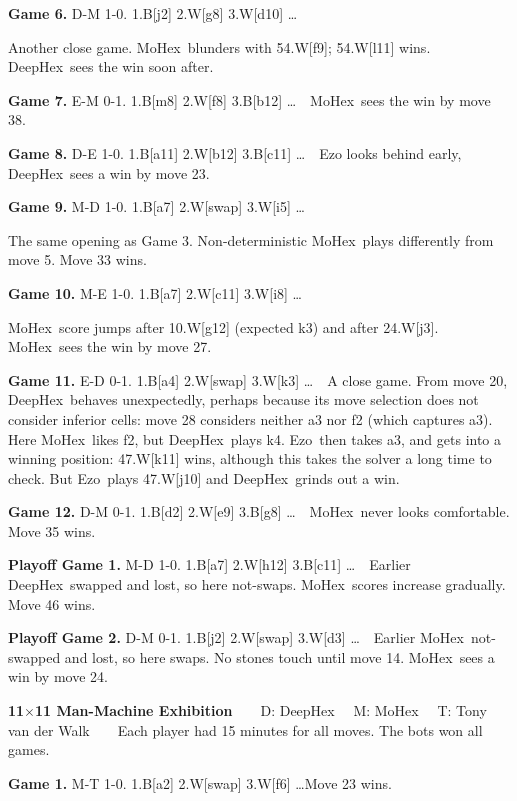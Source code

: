 \documentclass{icga}
\def\Dx{\mbox{\sc DeepHex}}
\def\Eo{\mbox{\sc Ezo}}
\def\Mx{\mbox{\sc MoHex}}
\def\TV{\mbox{\sc TV}} %
\begin{document}
{\bf Game 6.}
{\sc D-M 1-0.}
1.B[j2] 2.W[g8] 3.W[d10] \ldots \ \ 

\hfill Another close game.
\Mx\ blunders with 54.W[f9]; 54.W[l11] wins.
\Dx\ sees the win soon after.

{\bf Game 7.}
{\sc E-M 0-1.}
1.B[m8] 2.W[f8] 3.B[b12] \ldots \ \ 
\hfill\Mx\ sees the win by move 38.

{\bf Game 8.}
{\sc D-E 1-0.}
1.B[a11] 2.W[b12] 3.B[c11] \ldots \ \ 
\Eo{} looks behind early, \Dx\ sees a win by move 23.

{\bf Game 9.}
{\sc M-D 1-0.}
1.B[a7] 2.W[swap] 3.W[i5] \ldots \ \ 

\hfill The same opening as Game 3.
Non-deterministic \Mx\ plays differently from move 5.
Move 33 wins.

{\bf Game 10.}
{\sc M-E 1-0.}
1.B[a7] 2.W[c11] 3.W[i8] \ldots \ \ 

\hfill\Mx{}ore jumps after 10.W[g12] (expected k3)
and after 24.W[j3]. \Mx\ sees the win by move 27.

{\bf Game 11.}
{\sc E-D 0-1.}
1.B[a4] 2.W[swap] 3.W[k3] \ldots \ \ 
A close game. From move 20, \Dx\ behaves unexpectedly,
perhaps because its move selection does not consider inferior cells:
move 28 considers neither a3 nor f2 (which captures a3).
Here \Mx\ likes f2, but \Dx\ plays k4.
\Eo\ then takes a3, and gets into a winning position:
47.W[k11] wins, although this takes the solver a long time to check.
But \Eo\ plays 47.W[j10] and \Dx\ grinds out a win.

{\bf Game 12.}
{\sc D-M 0-1.}
1.B[d2] 2.W[e9] 3.B[g8] \ldots \ \ 
\hfill\Mx\ never looks comfortable. Move 35 wins.

{\bf Playoff Game 1.}
{\sc M-D 1-0.}
1.B[a7] 2.W[h12] 3.B[c11] \ldots \ \ 
Earlier \Dx\ swapped and lost, so here not-swaps.
\Mx{}ores increase gradually. Move 46 wins.

{\bf Playoff Game 2.}
{\sc D-M 0-1.}
1.B[j2] 2.W[swap] 3.W[d3] \ldots \ \ 
Earlier \Mx\ not-swapped and lost, so here swaps. 
No stones touch until move 14. \Mx\ sees a win by move 24.

{\large\bf 11$\times$11 Man-Machine Exhibition} 
~ ~ {\sc D: \Dx\ ~ M: \Mx\ ~ T: Tony van der Walk} ~ ~ 
Each player had 15 minutes for all moves. The bots won all games.

{\bf Game 1.}
{\sc M-T 1-0.}
1.B[a2] 2.W[swap] 3.W[f6] \ldots \hfill Move 23 wins.
\end{document}
